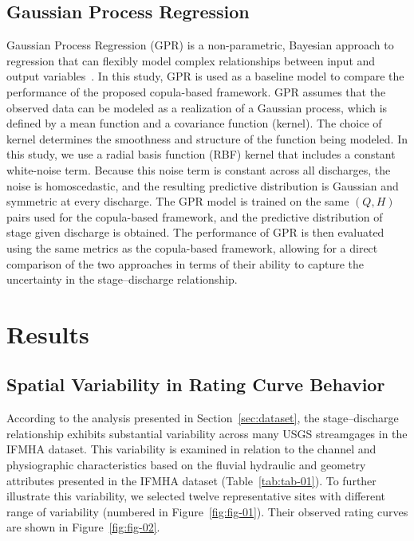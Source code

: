 \documentclass[11pt]{article}
\begin{document}
\subsection{Gaussian Process Regression}
Gaussian Process Regression (GPR) is a non-parametric, Bayesian approach to regression that can flexibly model complex relationships between input and output variables~\cite{williams2006gaussian}. In this study, GPR is used as a baseline model to compare the performance of the proposed copula-based framework. GPR assumes that the observed data can be modeled as a realization of a Gaussian process, which is defined by a mean function and a covariance function (kernel). The choice of kernel determines the smoothness and structure of the function being modeled. In this study, we use a radial basis function (RBF) kernel that includes a constant white-noise term. Because this noise term is constant across all discharges, the noise is homoscedastic, and the resulting predictive distribution is Gaussian and symmetric at every discharge. The GPR model is trained on the same $(Q, H)$ pairs used for the copula-based framework, and the predictive distribution of stage given discharge is obtained. The performance of GPR is then evaluated using the same metrics as the copula-based framework, allowing for a direct comparison of the two approaches in terms of their ability to capture the uncertainty in the stage--discharge relationship.

\section{Results}

\subsection{Spatial Variability in Rating Curve Behavior}
According to the analysis presented in Section~\ref{sec:dataset}, the stage--discharge relationship exhibits substantial variability across many USGS streamgages in the IFMHA dataset. This variability is examined in relation to the channel and physiographic characteristics based on the fluvial hydraulic and geometry attributes presented in the IFMHA dataset (Table~\ref{tab:tab-01}). To further illustrate this variability, we selected twelve representative sites with different range of variability (numbered in Figure~\ref{fig:fig-01}). Their observed rating curves are shown in Figure~\ref{fig:fig-02}.
\end{document}
